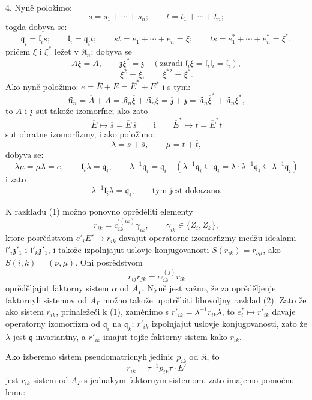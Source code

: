 \documentclass[11pt]{article}
\begin{document}
4. Nyně položimo:
\[
s=s_1+\cdots+s_n;\qquad t=t_1+\cdots+t_n;
\]
togda dobyva se:
\[
\mathfrak q_i=\mathfrak l_is;\qquad
\mathfrak l_i=\mathfrak q_it;\qquad
st=e_1+\cdots+e_n=\xi;\qquad
ts=e_1^*+\cdots+e_n^*=\xi^*,
\]
pričem \(\xi\) i \(\xi^*\) ležet v \(\mathfrak K_n\); dobyva se
\[
A\xi=A,\qquad \mathfrak z\xi^*=\mathfrak z\quad
(\text{zaradi }\mathfrak l_i\xi=\mathfrak l_i\mathfrak l_i=\mathfrak l_i),
\]
\[
\xi^2=\xi,\qquad \xi^{*2}=\xi^*.
\]
Ako nyně položimo: \(e=\overline E+E=\overline E^*+E^*\) i s tym:
\[
\mathfrak K_n=\overline A+A
=\mathfrak K_n\overline\xi+\mathfrak K_n\xi
=\overline{\mathfrak z}+\mathfrak z
=\mathfrak K_n\overline\xi^*+\mathfrak K_n\xi^*,
\]
to \(\overline A\) i \(\overline{\mathfrak z}\) sut takože izomorfne; ako zato
\[
\overline E\mapsto\overline s=\overline E\,\overline s
\qquad\text{i}\qquad
\overline E^*\mapsto\overline t=\overline E^*\overline t
\]
sut obratne izomorfizmy, i ako položimo:
\[
\lambda=s+\overline s,\qquad \mu=t+\overline t,
\]
dobyva se:
\[
\lambda\mu=\mu\lambda=e,\qquad
\mathfrak l_i\lambda=\mathfrak q_i,\qquad
\lambda^{-1}\mathfrak q_i=\mathfrak q_i
\quad
(\lambda^{-1}\mathfrak q_i\subseteq\mathfrak q_i
=\lambda\cdot\lambda^{-1}\mathfrak q_i\subseteq\lambda^{-1}\mathfrak q_i)
\]
i zato
\[
\lambda^{-1}\mathfrak l_i\lambda=\mathfrak q_i,\qquad \text{tym jest dokazano.}
\]

K razkladu (1) možno ponovno oprěděliti elementy
\[
r_{ik}=c_{ik}^{\prime(ik)}\gamma_{ik},\qquad \gamma_{ik}\in\{Z_i,Z_k\},
\]
ktore posrědstvom \(e'_iE'\mapsto r_{ik}\) davajut operatorne izomorfizmy medžu idealami \(\mathfrak l'_i\mathfrak z'_1\) i \(\mathfrak l'_k\mathfrak z'_1\), i takože izpolnjajut uslovje konjugovanosti \(S(r_{ik})=r_{\nu\mu}\), ako \(S(i,k)=(\nu,\mu)\). Oni posrědstvom
\[
r_{ij}r_{jk}=\alpha_{ik}^{(j)}r_{ik}
\]
oprěděljajut faktorny sistem \(\alpha\) od \(A_\Gamma\). Nyně jest važno, že za oprěděljenje faktornyh sistemov od \(A_\Gamma\) možno takože upotrěbiti libovoljny razklad (2). Zato že ako sistem \(r_{ik}\), prinaležeči k (1), zaměnimo s \(r'_{ik}=\lambda^{-1}r_{ik}\lambda\), to \(e_i^*\mapsto r'_{ik}\) davaje operatorny izomorfizm od \(\mathfrak q_i\) na \(\mathfrak q_k\); \(r'_{ik}\) izpolnjajut uslovje konjugovanosti, zato že \(\lambda\) jest \(\mathfrak q\)-invariantny, a \(r'_{ik}\) imajut tojže faktorny sistem kako \(r_{ik}\).

Ako izberemo sistem pseudomatricnyh jedinic \(p_{ik}\) od \(\mathfrak K\), to
\[
r_{ik}=\tau^{-1}p_{ik}\tau\cdot E'
\]
jest \(r_{ik}\)-sistem od \(A_\Gamma\) s jednakym faktornym sistemom. zato imajemo pomoćnu lemu:
\end{document}
